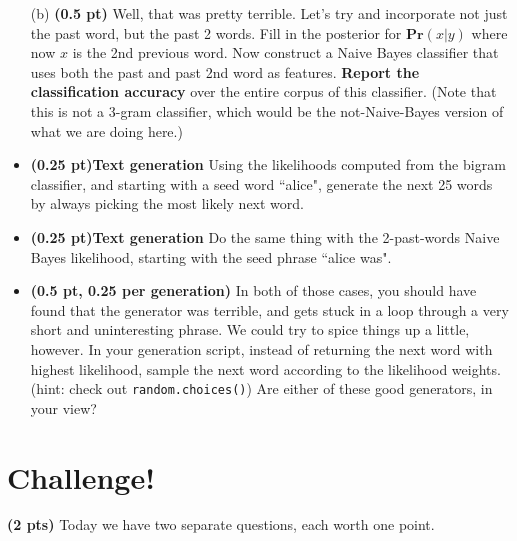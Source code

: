 \documentclass{article}
\newcommand{\pr}{\mathbf{Pr}}
\newcommand{\showpoints}[1]{\textbf{(#1)}}
\begin{document}
\begin{enumerate}
\begin{itemize}
\item[(b)] \showpoints{0.5 pt}   Well, that was pretty terrible. Let's try and incorporate not just the past word, but the past 2 words. Fill in the posterior for $\pr(x|y)$ where now $x$ is the 2nd previous word. 
 Now construct a Naive Bayes classifier that uses both the past and past 2nd word as features.  \textbf{Report the classification accuracy} over the entire corpus of this classifier. (Note that this is not a 3-gram classifier, which would be the not-Naive-Bayes version of what we are doing here.)


\item  \showpoints{0.25 pt}\textbf{Text generation} Using the likelihoods computed from the bigram classifier, and starting with a seed word ``alice", generate the next 25 words by always picking the most likely next word.



\item  \showpoints{0.25 pt}\textbf{Text generation} Do the same thing with the 2-past-words Naive Bayes likelihood, starting with the seed phrase ``alice was". 


\item  \showpoints{0.5 pt, 0.25 per generation} In both of those cases, you should have found that the generator was terrible, and gets stuck in a loop through a very short and uninteresting phrase. We could try to spice things up a little, however. In your generation script, instead of returning the next word with highest likelihood, sample the next word according to the likelihood weights. (hint: check out \texttt{random.choices()})
Are either of these good generators, in your view?



\end{itemize}






\end{enumerate}
\newpage
\section*{Challenge!} 
 \showpoints{2 pts} Today we have two separate questions, each worth one point.
 
\end{document}
